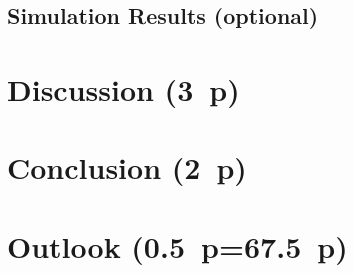 \subsection{Simulation Results (optional)}\label{sec:simulation-results}

\newpage
\section{Discussion (3~p)}\label{sec:discussion}

\newpage
\section{Conclusion (2~p)}\label{sec:conclusion}

\newpage
\section{Outlook (0.5~p=67.5~p)}\label{sec:outlook}

